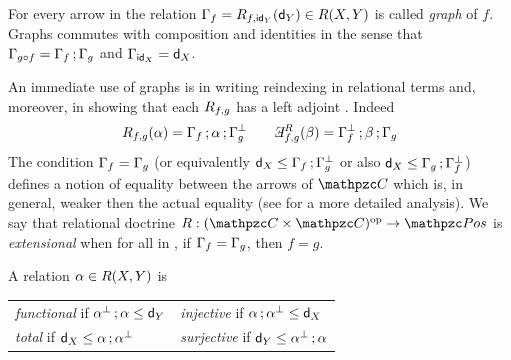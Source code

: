 For every arrow  in \CC the relation $\Gamma_{f}=R_{f,\mathsf{id}_Y}(\mathsf{d}_Y)\in R(X,Y)$ is called \emph{graph} of $f$. 
Graphs commutes with composition and identities in the sense that  
$\Gamma_{g\circ f} = \Gamma_{f}\mathop{\mathbf{;}}\Gamma_{g}$ and $\Gamma_{\mathsf{id}_X} = \mathsf{d}_X$. 

An immediate use of graphs is in writing reindexing  in relational terms and, moreover, in showing that each $R_{f,g}$ has a left adjoint . Indeed 
\[
\RDoc\reidx{f,g}(\relr) = \gr{f} \rcomp \relr \rcomp \gr{g}\rconv 
\qquad 
\Ex^\RDoc\reidx{f,g}(\rels) = \gr{f}\rconv \rcomp \rels \rcomp \gr{g} 
\]
%
The condition $\Gamma_{f}=\Gamma_{g}$ (or equivalently  $\mathsf{d}_X\le \Gamma_{f}\mathop{\mathbf{;}}\Gamma_{g}^{\bot}$ or also $\mathsf{d}_X\le \Gamma_{g}\mathop{\mathbf{;}}\Gamma_{f}^{\bot}$) defines a notion of equality between the arrows of $\CC$ which is, in general, weaker then the actual equality (see \cite{DagninoP25tac,DagninoP25apal} for a more detailed analysis). 
% 
We say that  relational doctrine $\fun{\RDoc}{\bop\CC}{\Pos}$ is \emph{extensional} when for all  in \CC, if $\Gamma_{f} = \Gamma_{g}$, then $f = g$. 



A relation  $\alpha\in R(X,Y)$ is
\begin{center}
\begin{tabular}{ll}
\emph{functional} if $\alpha^{\bot} \mathop{\mathbf{;}} \alpha \leq \mathsf{d}_Y$&\emph{injective} if $\alpha\mathop{\mathbf{;}}\alpha^{\bot} \leq \mathsf{d}_X$\\[1ex]
\emph{total} if $\mathsf{d}_X \leq \alpha\mathop{\mathbf{;}}\alpha^{\bot}$&\emph{surjective} if $\mathsf{d}_Y \leq \alpha^{\bot} \mathop{\mathbf{;}} \alpha$
\end{tabular}
\end{center}

